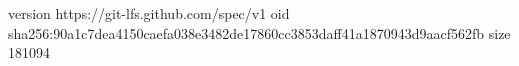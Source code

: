 version https://git-lfs.github.com/spec/v1
oid sha256:90a1c7dea4150caefa038e3482de17860cc3853daff41a1870943d9aacf562fb
size 181094
